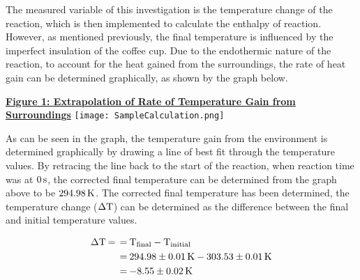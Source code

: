 \documentclass{article}
\begin{document}
\noindent
The measured variable of this investigation is the temperature change of the reaction, which is then implemented to calculate the enthalpy of reaction. However, as mentioned previously, the final temperature is influenced by the imperfect insulation of the coffee cup. Due to the endothermic nature of the reaction, to account for the heat gained from the surroundings, the rate of heat gain can be determined graphically, as shown by the graph below.

\begin{center}
\textbf{\underline{Figure 1: Extrapolation of Rate of Temperature Gain from Surroundings}}
\texttt{[image: SampleCalculation.png]}    
\end{center}


\noindent
As can be seen in the graph, the temperature gain from the environment is determined graphically by drawing a line of best fit through the temperature values. By retracing the line back to the start of the reaction, when reaction time was at $\ce{0s}$, the corrected final temperature can be determined from the graph above to be $\ce{294.98K}$. The corrected final temperature has been determined, the temperature change ($\ce{\Delta T}$) can be determined as the difference between the final and initial temperature values.
\begin{tcolorbox}[title=Calculation of Temperature Change ($\ce{\Delta T}$)]
\begin{equation}
    \begin{split}
        \ce{
        \Delta T = &= T_{final} - T_{initial} \\
        &= 294.98 \pm 0.01 \si{K} - 303.53 \pm 0.01 \si{K} \\
        &= -8.55 \pm 0.02 K
        }
    \end{split}
\end{equation}

\end{tcolorbox}
\end{document}
